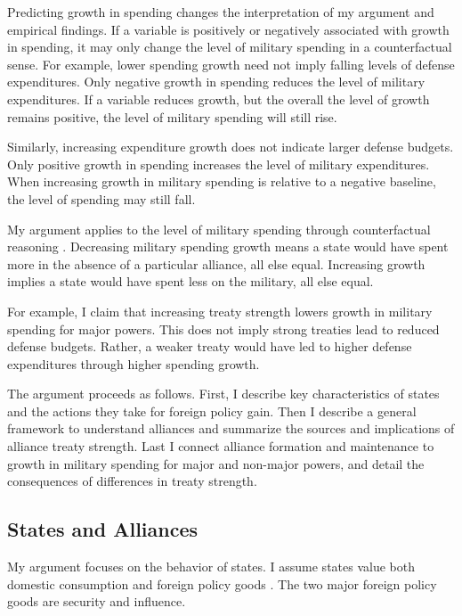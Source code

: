 \documentclass[12pt]{article}
\begin{document}
Predicting growth in spending changes the interpretation of my argument and empirical findings. 
If a variable is positively or negatively associated with growth in spending, it may only change the level of military spending in a counterfactual sense. 
For example, lower spending growth need not imply falling levels of defense expenditures. 
Only negative growth in spending reduces the level of military expenditures. 
If a variable reduces growth, but the overall the level of growth remains positive, the level of military spending will still rise. 


Similarly, increasing expenditure growth does not indicate larger defense budgets. 
Only positive growth in spending increases the level of military expenditures. 
When increasing growth in military spending is relative to a negative baseline, the level of spending may still fall. 


My argument applies to the level of military spending through counterfactual reasoning \citep{Fearon1991}. 
Decreasing military spending growth means a state would have spent more in the absence of a particular alliance, all else equal. 
Increasing growth implies a state would have spent less on the military, all else equal.


For example, I claim that increasing treaty strength lowers growth in military spending for major powers. 
This does not imply strong treaties lead to reduced defense budgets. 
Rather, a weaker treaty would have led to higher defense expenditures through higher spending growth. 


The argument proceeds as follows.
First, I describe key characteristics of states and the actions they take for foreign policy gain. 
Then I describe a general framework to understand alliances and summarize the sources and implications of alliance treaty strength. 
Last I connect alliance formation and maintenance to growth in military spending for major and non-major powers, and detail the consequences of differences in treaty strength.  



\subsection{States and Alliances}


My argument focuses on the behavior of states. 
I assume states value both domestic consumption and foreign policy goods \citep{Powell1993, Fearon2018}. 
The two major foreign policy goods are security and influence. 
\end{document}
